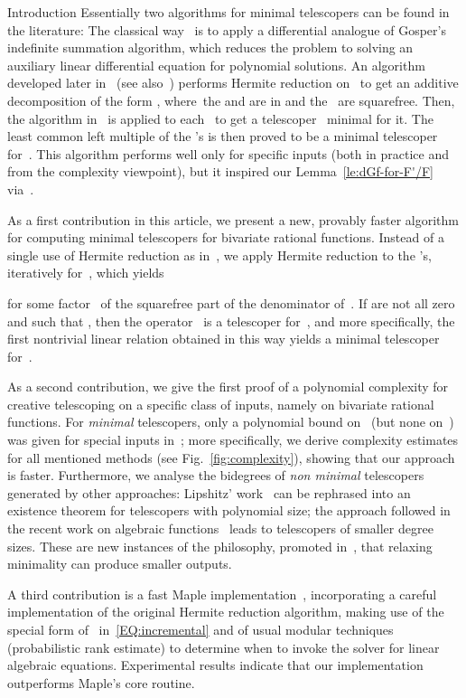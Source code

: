 \documentclass{sig-alt-full}
\begin{document}
\begin{section}{Introduction}
Essentially two algorithms for minimal telescopers can be
found in the literature:
The classical way~\cite{Almkvist1990}
is to apply a differential analogue of Gosper's indefinite summation
algorithm, which reduces the problem to solving an auxiliary linear
differential equation for polynomial solutions.
An algorithm developed later in~\cite{GeddesLe2002} (see
also~\cite{Le2000}) performs Hermite reduction on~ to get an
additive decomposition of the form , where~the  and  are in  and the~
are squarefree. Then, the algorithm in~\cite{Almkvist1990} is
applied to each~ to get a telescoper~ minimal for it.
The least common left multiple of the 's is then proved to be a
minimal telescoper for~. This algorithm performs well only for
specific inputs (both in practice and from the complexity
viewpoint), but it inspired our Lemma~\ref{le:dGf-for-F'/F}
via~\cite{Le2000}.

As a first contribution in this article, we present a new, provably
faster algorithm for computing minimal telescopers for bivariate
rational functions.
Instead of a single use of Hermite reduction as in~\cite{Le2000}, we apply
Hermite reduction to the 's, iteratively for~,
which yields

for some factor~ of the squarefree part of the denominator of~.
If  are not all zero and such that
, then the operator~ is a telescoper for~, and more specifically, the first nontrivial linear
relation obtained in this way yields a minimal telescoper for~.

As a second contribution, we give the first proof of a polynomial
complexity for creative telescoping on a specific class of inputs,
namely on bivariate rational functions.
For \emph{minimal\/} telescopers, only a polynomial bound on~ (but none
on~) was given for special inputs in~\cite{GeddesLe2002};
more specifically, we derive complexity estimates for all
mentioned methods (see Fig.~\ref{fig:complexity}), showing that
our approach is faster.
Furthermore, we analyse the bidegrees of \emph{non minimal\/}
telescopers generated by other approaches:
Lipshitz' work~\cite{Lipshitz1988} can be
rephrased into an existence theorem for telescopers with
polynomial size; the approach followed in the recent work on
algebraic functions~\cite{BCLSS2007} leads to
telescopers of smaller degree sizes.
These are new instances of the philosophy, promoted in~\cite{BCLSS2007},
that relaxing minimality
can produce smaller outputs.

A third contribution is a fast Maple implementation~\cite{OurSoft},
incorporating a
careful implementation of the original Hermite reduction algorithm,
making use of the special form of~ in~\eqref{EQ:incremental}
and of usual modular techniques (probabilistic rank estimate) to
determine when to invoke the solver for linear algebraic equations.
Experimental results indicate that our implementation
outperforms Maple's core routine.


\end{section}
\end{document}

